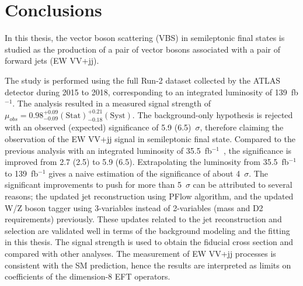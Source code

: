 \chapter{Conclusions}
\label{chap:conclusions}

In this thesis, the vector boson scattering (VBS) in semileptonic final states is studied as the production of a pair of vector bosons associated with a pair of forward jets (EW VV+jj). 

The study is performed using the full Run-2 dataset collected by the ATLAS detector during 2015 to 2018, corresponding to an integrated luminosity of 139~fb$^{-1}$.
The analysis resulted in a measured signal strength of $\mu_{obs} = 0.98^{+ 0.09}_{- 0.09}(\mathrm{Stat})^{+ 0.21}_{- 0.18}(\mathrm{Syst})$.
The background-only hypothesis is rejected with an observed (expected) significance of 5.9 (6.5)~$\sigma$, therefore claiming the observation of the EW VV+jj signal in semileptonic final state. 
Compared to the previous analysis with an integrated luminosity of 35.5~fb$^{-1}$~\cite{STDM-2017-20}, the significance is improved from 2.7 (2.5) to 5.9 (6.5).
Extrapolating the luminosity from 35.5~fb$^{-1}$ to 139~fb$^{-1}$ gives a naive estimation of the significance of about 4~$\sigma$.
The significant improvements to push for more than 5~$\sigma$ can be attributed to several reasons; the updated jet reconstruction using PFlow algorithm, and the updated W/Z boson tagger using 3-variables instead of 2-variables (mass and D2 requirements) previously. 
These updates related to the jet reconstruction and selection are validated well in terms of the background modeling and the fitting in this thesis.
The signal strength is used to obtain the fiducial cross section and compared with other analyses.
The measurement of EW VV+jj processes is consistent with the SM prediction, hence the results are interpreted as limits on coefficients of the dimension-8 EFT operators.

